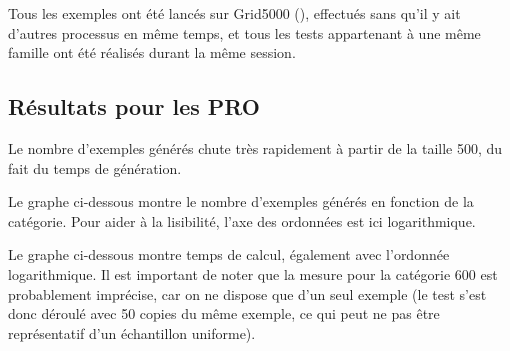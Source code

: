\documentclass[12pt, a4paper]{article}
\begin{document}
Tous les exemples ont été lancés sur Grid5000 (\href{https://www.grid5000.fr/w/Grid5000:Home}{}), effectués sans qu'il y ait d'autres processus en même temps, et tous les tests appartenant à une même famille ont été réalisés durant la même session.

\subsection{Résultats pour les PRO}

Le nombre d'exemples générés chute très rapidement à partir de la taille 500, du fait du temps de génération.

Le graphe ci-dessous montre le nombre d'exemples générés en fonction de la catégorie. Pour aider à la lisibilité, l'axe des ordonnées est ici logarithmique.


Le graphe ci-dessous montre temps de calcul, également avec l'ordonnée logarithmique. Il est important de noter que la mesure pour la catégorie 600 est probablement imprécise, car on ne dispose que d'un seul exemple (le test s'est donc déroulé avec 50 copies du même exemple, ce qui peut ne pas être représentatif d'un échantillon uniforme).
\end{document}
